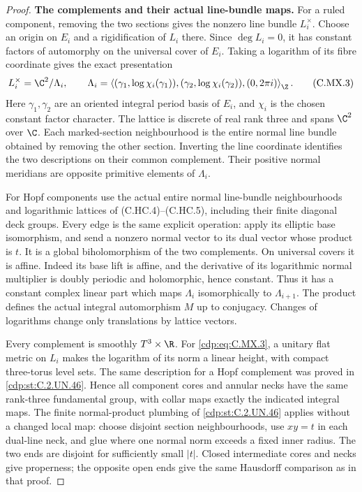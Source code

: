 \begin{proof}
\par\medskip\noindent\textbf{The complements and their actual line-bundle maps.}
For a ruled component, removing the two sections gives the
nonzero line bundle $L_i^\times$. Choose an origin on $E_i$
and a rigidification of $L_i$ there. Since $\deg L_i=0$, it
has constant factors of automorphy on the universal cover
of $E_i$. Taking a logarithm of its fibre coordinate gives
the exact presentation
\[
 L_i^\times=\C^2/\Lambda_i,\qquad
 \Lambda_i=\left\langle
       (\gamma_1,\log\chi_i(\gamma_1)),
       (\gamma_2,\log\chi_i(\gamma_2)),(0,2\pi i)
                         \right\rangle_{\Z} .             \tag{C.MX.3}\label{cdp:eq:C.MX.3}
\]
Here $\gamma_1,\gamma_2$ are an oriented integral period
basis of $E_i$, and $\chi_i$ is the chosen constant
factor character. The lattice is discrete of real rank
three and spans $\C^2$ over $\C$. Each marked-section
neighbourhood is the entire normal line bundle obtained
by removing the other section. Inverting the line
coordinate identifies the two descriptions on their
common complement. Their positive normal meridians are
opposite primitive elements of $\Lambda_i$.

For Hopf components use the actual entire normal
line-bundle neighbourhoods and logarithmic lattices
of (C.HC.4)--(C.HC.5), including their finite diagonal
deck groups. Every edge is the same explicit operation:
apply its elliptic base isomorphism, and send a nonzero
normal vector to its dual vector whose product is $t$.
It is a global biholomorphism of the two complements.
On universal covers it is affine. Indeed its base lift
is affine, and the derivative of its logarithmic normal
multiplier is doubly periodic and holomorphic, hence
constant. Thus it has a constant complex linear part
which maps $\Lambda_i$ isomorphically to $\Lambda_{i+1}$.
The product defines the actual integral automorphism
$M$ up to conjugacy. Changes of logarithms change only
translations by lattice vectors.

Every complement is smoothly $T^3\times\R$.
For \eqref{cdp:eq:C.MX.3}, a unitary flat metric on $L_i$ makes
the logarithm of its norm a linear height, with compact
three-torus level sets. The same description for a
Hopf complement was proved in \ref{cdp:st:C.2.UN.46}. Hence all component
cores and annular necks have the same rank-three
fundamental group, with collar maps exactly the
indicated integral maps. The finite normal-product
plumbing of \ref{cdp:st:C.2.UN.46} applies without a changed local map:
choose disjoint section neighbourhoods, use $xy=t$
in each dual-line neck, and glue where one normal
norm exceeds a fixed inner radius. The two ends
are disjoint for sufficiently small $|t|$.
Closed intermediate cores and necks give properness;
the opposite open ends give the same Hausdorff
comparison as in that proof.


\end{proof}
